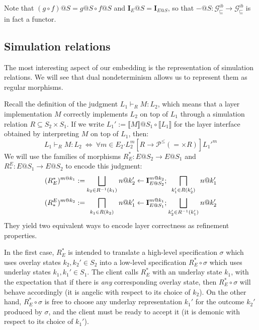 \documentclass[11pt,oneside,draft]{book}
\theoremstyle{definition}
\newcommand{\gcat}{\mathcal{G}_{\sqsubseteq}}
\newcommand{\bdot}{\boldsymbol{\cdot}}
\begin{document}
Note that
$(g \circ f)@S = g@S \circ f@S$ and
$\mathbf{I}_E@S = \mathbf{I}_{E@S}$,
so that $-@S : \gcat^{ib} \rightarrow \gcat^{ib}$
is in fact a functor.


\subsection{Simulation relations} %

The most interesting aspect of our embedding
is the representation of simulation relations.
We will see that dual nondeterminism
allows us to represent them as regular morphisms.

Recall the definition of
the judgment $L_1 \vdash_R M : L_2$,
which means that a layer implementation $M$
correctly implements $L_2$ on top of $L_1$
through a simulation relation $R \subseteq S_2 \times S_1$.
If we write
$L_1' := \llbracket M \rrbracket @ S_1 \circ \llbracket L_1 \rrbracket$
for the layer interface obtained
by interpreting $M$ on top of $L_1$,
then:
\[
  L_1 \vdash_R M : L_2 \:\Leftrightarrow\:
  \forall m \in E_2 \bdot
    L_2^m
    \mathrel{[R \rightarrow \mathcal{P}^\le({=} \times R)]}
    {L_1'}^m
\]
We will use the families of morphisms
$R^*_E : E@S_2 \rightarrow E@S_1$ and
$R_*^E : E@S_1 \rightarrow E@S_2$
to encode this judgment:
\[
  {\everymath={\displaystyle}
  \begin{array}{r@{\:}c@{\:}c@{\:}c@{\:}l}
  (R^*_E)^{m@k_1} := &
    \bigsqcup_{k_2 \in R^{-1}(k_1)} &
    n@k_2' \leftarrow \mathbf{I}^{m@k_2}_{E@S_2} ; &
    \bigsqcap_{k_1' \in R(k_2')} &
    n@k_1' \\[4ex]
  (R_*^E)^{m@k_2} := &
    \bigsqcap_{k_1 \in R(k_2)} &
    n@k_1' \leftarrow \mathbf{I}^{m@k_1}_{E@S_1} ; &
    \bigsqcup_{k_2' \in R^{-1}(k_1')} &
    n@k_2'
  \end{array}}
\]
They yield two equivalent ways to encode
layer correctness as refinement properties.

In the first case,
$R^*_E$ is intended to translate
a high-level specification $\sigma$
which uses overlay states $k_2, k_2' \in S_2$
into a low-level specification $R^*_E \circ \sigma$
which uses underlay states
$k_1, k_1' \in S_1$.
The client calls $R^*_E$
with an underlay state $k_1$,
with the expectation that if there is \emph{any}
corresponding overlay state,
then $R^*_E \circ \sigma$ will behave accordingly
(it is angelic with respect to its choice of $k_2$).
On the other hand,
$R^*_E \circ \sigma$ is free to choose any underlay representation
$k_1'$
for the outcome $k_2'$ produced by $\sigma$,
and the client must be ready to accept it
(it is demonic with respect to its choice of $k_1'$).
\end{document}
